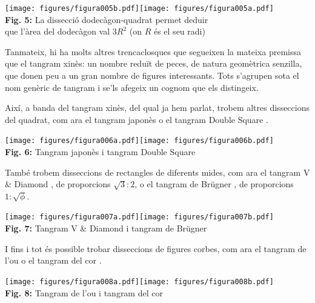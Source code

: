 \documentclass[a4paper,11pt]{article}
\begin{document}
\begin{multicols}{2}
            \begin{center}
                \texttt{[image: figures/figura005b.pdf]}\qquad\texttt{[image: figures/figura005a.pdf]} \\
                \footnotesize{\textbf{Fig. 5:} La dissecció dodecàgon-quadrat permet deduir\\ que l'àrea del dodecàgon val $3R^2$ (on $R$ és el seu radi)}
            \end{center}

            Tanmateix, hi ha molts altres trencaclosques que segueixen la mateixa premissa que el tangram xinès: un nombre reduït de peces, de natura geomètrica senzilla, que donen peu a un gran nombre de figures interessants. Tots s'agrupen sota el nom genèric de tangram i se'ls afegeix un cognom que els distingeix.

            Així, a banda del tangram xinès, del qual ja hem parlat, trobem altres disseccions del quadrat, com ara el tangram japonès \cite{gardner1988time} o el tangram Double Square \cite{stegmann2019}.

            \begin{center}
                \texttt{[image: figures/figura006a.pdf]}\qquad\texttt{[image: figures/figura006b.pdf]} \\
                \footnotesize{\textbf{Fig. 6:} Tangram japonès i tangram Double Square}
            \end{center}

            També trobem disseccions de rectangles de diferents mides, com ara el tangram V \& Diamond \cite{ito2006tangraphy}, de proporcions ${\sqrt{3}:2}$, o el tangram de Brügner \cite{brugner1984three}, de proporcions ${1:\sqrt{\phi}}$.

            \begin{center}
                \texttt{[image: figures/figura007a.pdf]}\qquad\texttt{[image: figures/figura007b.pdf]} \\
                \footnotesize{\textbf{Fig. 7:} Tangram V \& Diamond i tangram de Brügner}
            \end{center}

            I fins i tot és possible trobar disseccions de figures corbes, com ara el tangram de l'ou o el tangram del cor \cite{demarchi2012libro}.

            \begin{center}
                \texttt{[image: figures/figura008a.pdf]}\quad\texttt{[image: figures/figura008b.pdf]} \\
                \footnotesize{\textbf{Fig. 8:} Tangram de l'ou i tangram del cor}
            \end{center}


\end{multicols}
\end{document}
